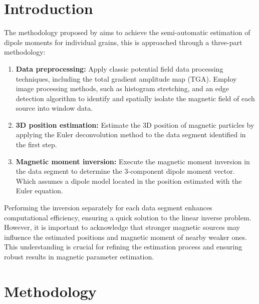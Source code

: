 \section{Introduction}

The methodology proposed by \citet{Souza-Junior2023b} aims to achieve the semi-automatic estimation of dipole moments for individual grains, this is approached through a three-part methodology:

\begin{enumerate}
    \item \textbf{Data preprocessing:} Apply classic potential field data processing techniques, including the total gradient amplitude map (TGA). Employ image processing methods, such as histogram stretching, and an edge detection algorithm to identify and spatially isolate the magnetic field of each source into window data.

    \item \textbf{3D position estimation:} Estimate the 3D position of magnetic particles by applying the Euler deconvolution method to the data segment identified in the first step.

    \item \textbf{Magnetic moment inversion:} Execute the magnetic moment inversion in the data segment to determine the 3-component dipole moment vector. Which assumes a dipole model located in the position estimated with the Euler equation. 
\end{enumerate}

Performing the inversion separately for each data segment enhances computational efficiency, ensuring a quick solution to the linear inverse problem. However, it is important to acknowledge that stronger magnetic sources may influence the estimated positions and magnetic moment of nearby weaker ones. This understanding is crucial for refining the estimation process and ensuring robust results in magnetic parameter estimation.

\section{Methodology}


